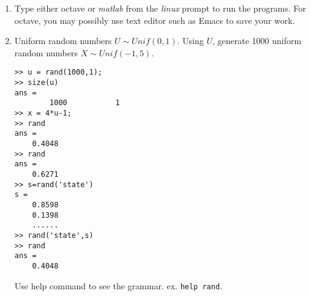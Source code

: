 \documentclass[11pt,twocolumn]{article} %
\begin{document}
\begin{enumerate}
\item Type either octave or {\em matlab} from the {\em linux}
prompt to run the programs. For octave, you may possibly use text
editor such as Emacs to save your work.

\item Uniform random numbers $U \sim Unif(0,1)$. Using $U$,
generate 1000 uniform random numbers $X \sim Unif(-1,5)$.
\begin{verbatim}
>> u = rand(1000,1);
>> size(u)
ans =
        1000           1
>> x = 4*u-1;
>> rand
ans =
    0.4048
>> rand
ans =
    0.6271
>> s=rand('state')
s =
    0.8598
    0.1398
    ......
>> rand('state',s)
>> rand
ans =
    0.4048
\end{verbatim}

Use help command to see the grammar. ex. {\tt help rand}.

\end{enumerate}
\end{document}
